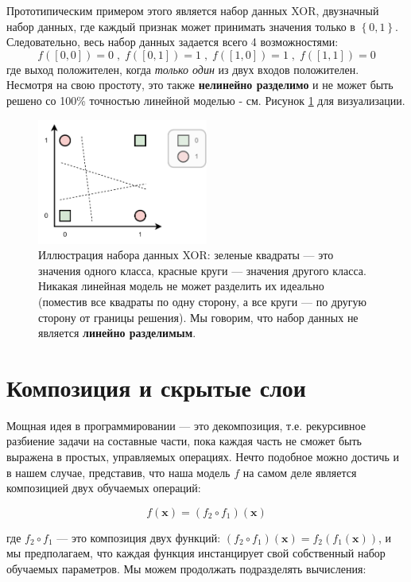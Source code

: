 Прототипическим примером этого является набор данных XOR, двузначный набор данных, где каждый признак может принимать значения только в $\left\{0, 1\right\}$. Следовательно, весь набор данных задается всего 4 возможностями:
%
$$
f([0,0])=0 \;,\; f([0,1])=1\;,\;f([1,0])=1\;,\;f([1,1])=0
$$
%
где выход положителен, когда \textit{только один} из двух входов положителен. Несмотря на свою простоту, это также \textbf{нелинейно разделимо} и не может быть решено со 100\% точностью линейной моделью - см. Рисунок \ref{fig:xor} для визуализации.

\begin{figure}
    \centering
    \hspace{1em}\includegraphics[width=0.5\textwidth]{images/XOR.pdf}
    \caption{Иллюстрация набора данных XOR: зеленые квадраты — это значения одного класса, красные круги — значения другого класса. Никакая линейная модель не может разделить их идеально (поместив все квадраты по одну сторону, а все круги — по другую сторону от границы решения). Мы говорим, что набор данных не является \textbf{линейно разделимым}.}
    \label{fig:xor}
\end{figure}


\section{Композиция и скрытые слои}

\addclock Мощная идея в программировании — это декомпозиция, т.е. рекурсивное разбиение задачи на составные части, пока каждая часть не сможет быть выражена в простых, управляемых операциях. Нечто подобное можно достичь и в нашем случае, представив, что наша модель $f$ на самом деле является композицией двух обучаемых операций:

$$
f(\mathbf{x})=(f_2 \circ f_1)(\mathbf{x})
$$

где $f_2 \circ f_1$ — это композиция двух функций: $(f_2 \circ f_1)(\mathbf{x}) = f_2(f_1(\mathbf{x}))$, и мы предполагаем, что каждая функция инстанцирует свой собственный набор обучаемых параметров. Мы можем продолжать подразделять вычисления:

